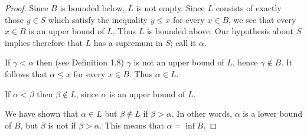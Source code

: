\begin{proof}
Since $B$ is bounded below, $L$ is not empty. Since $L$ consists of exactly
those $y \in S$ which satisfy the inequality $y \le x$ for every $x \in B$, we
see that every $x \in B$ is an upper bound of $L$. Thus $L$ is bounded above. Our hypothesis about $S$ implies therefore
that $L$ has a supremum in $S$; call it $\alpha$.

If $\gamma < \alpha$ then (see Definition 1.8) $\gamma$ is not an upper bound of
$L$, hence $\gamma \notin B$. It follows that
$\alpha \le x$ for every $x \in B$. Thus $\alpha \in L$.

If $\alpha < \beta$ then $\beta \notin L$, since $\alpha$ is an upper bound of
$L$.

We have shown that $\alpha \in L$ but $\beta \notin L$ if $\beta > \alpha$. In
other words, $\alpha$ is a lower bound of $B$, but $\beta$ is not if
$\beta > \alpha$. This means that $\alpha = \inf B$.
\end{proof}

